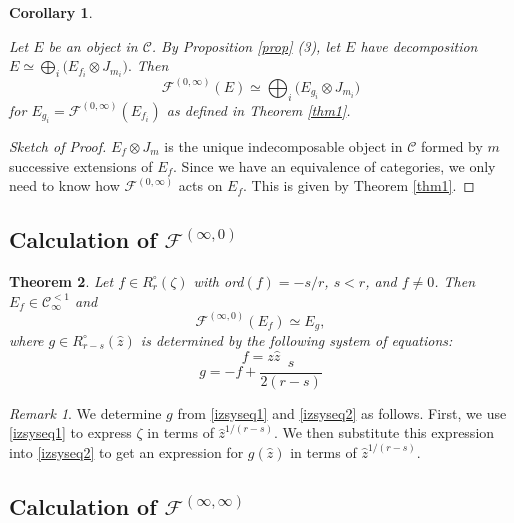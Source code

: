 \documentclass[11pt]{amsart}
\theoremstyle{plain}
\newtheorem{theorem}{Theorem}[section]
\newtheorem{corollary}[theorem]{Corollary}
\theoremstyle{definition}
\theoremstyle{remark}
\newtheorem*{remark}{Remark}
\def\d{\displaystyle}
\def\C{\mathcal{C}}
\def\comp{\circ}
\begin{document}
\begin{corollary}\label{corollary}

Let $E$ be an object in $\mathcal{C}$.  By Proposition \ref{prop} (3), let $E$ have decomposition
$\d{E\simeq \bigoplus_i \bigg(E_{f_i}\otimes J_{m_i}\bigg).}$
Then
$$\mathcal{F}^{(0, \infty)}(E)\simeq \bigoplus_i \bigg(E_{g_i}\otimes J_{m_i}\bigg)$$for $E_{g_i}=\mathcal{F}^{(0, \infty)}(E_{f_i})$ as defined in Theorem \ref{thm1}.
\end{corollary}

\begin{proof}[Sketch of Proof]
  $E_f\otimes J_m$ is the unique indecomposable object in $\mathcal{C}$ formed by $m$ successive extensions of $E_f$.  Since we have an equivalence of categories, we only need to know how $\mathcal{F}^{(0, \infty)}$ acts on $E_f$.  This is given by Theorem \ref{thm1}.
\end{proof}


\subsection{Calculation of $\mathcal{F}^{(\infty,0)}$}\label{subsec calc2}

\begin{theorem}\label{thm2}
	 Let $f\in R^\comp_r(\zeta)$ with ord$(f)=-s/r$, $s<r$, and $f\neq 0$. Then $E_f\in \C^{<1}_{\infty}$ and
\[\mathcal{F}^{(\infty, 0)}(E_{f})\simeq E_{g},\]
where $g\in R^\comp_{r-s}(\hat{z})$ is determined by the following system of equations:
\begin{equation}\label{izsyseq1}f=z\hat{z}
\end{equation}
\begin{equation}\label{izsyseq2} g=-f+\frac{s}{2(r-s)}
\end{equation}

\end{theorem}

\begin{remark}
We determine $g$ from \eqref{izsyseq1} and \eqref{izsyseq2} as follows.  First, we use \eqref{izsyseq1} to express $\zeta$ in terms of $\hat{z}^{1/(r-s)}$.  We then substitute this expression into \eqref{izsyseq2} to get an expression for $g(\hat{z})$ in terms of $\hat{z}^{1/(r-s)}$.
\end{remark}


\subsection{Calculation of $\mathcal{F}^{(\infty,\infty)}$}\label{subsec calc3}
\end{document}
